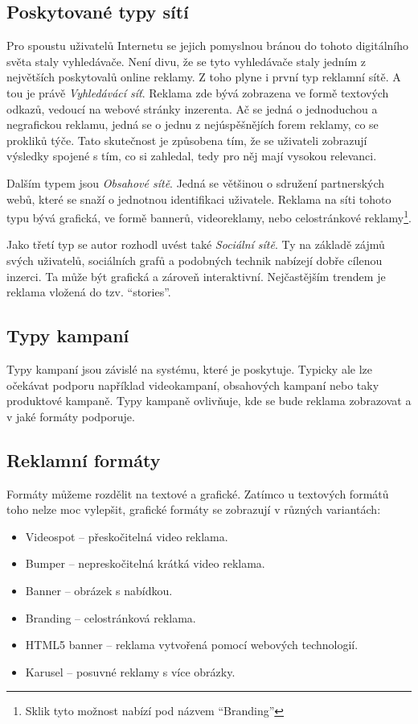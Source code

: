 \documentclass[czech,semestral]{diploma}
\begin{document}
\subsection{Poskytované typy sítí}
Pro spoustu uživatelů Internetu se jejich pomyslnou bránou do tohoto digitálního světa staly vyhledávače. Není divu, že se tyto vyhledávače staly jedním z největších
poskytovalů online reklamy. Z toho plyne i první typ reklamní sítě. A tou je právě \emph{Vyhledávácí síť}. Reklama zde bývá zobrazena ve formě textových odkazů,
vedoucí na webové stránky inzerenta. Ač se jedná o jednoduchou a negrafickou reklamu, jedná se o jednu z nejúspěšnějích forem reklamy, co se prokliků týče. Tato skutečnost
je způsobena tím, že se uživateli zobrazují výsledky spojené s tím, co si zahledal, tedy pro něj mají vysokou relevanci.

Dalším typem jsou \emph{Obsahové sítě}. Jedná se většinou o sdružení partnerských webů, které se snaží o jednotnou identifikaci uživatele. Reklama na síti tohoto typu bývá
grafická, ve formě bannerů, videoreklamy, nebo celostránkové reklamy\footnote{Sklik tyto možnost nabízí pod názvem \enquote{Branding}}.

Jako třetí typ se autor rozhodl uvést také \emph{Sociální sítě}. Ty na základě zájmů svých uživatelů, sociálních grafů a podobných technik nabízejí dobře cílenou inzerci.
Ta může být grafická a zároveň interaktivní. Nejčastějším trendem je reklama vložená do tzv. \enquote{stories}.

\subsection{Typy kampaní}
Typy kampaní jsou závislé na systému, které je poskytuje. Typicky ale lze očekávat podporu například videokampaní, obsahových kampaní nebo taky produktové kampaně.
Typy kampaně ovlivňuje, kde se bude reklama zobrazovat a v jaké formáty podporuje. 

\subsection{Reklamní formáty}
Formáty můžeme rozdělit na textové a grafické. Zatímco u textových formátů toho nelze moc vylepšit, grafické formáty se zobrazují v různých variantách:
\begin{itemize}
    \item Videospot -- přeskočitelná video reklama.
    \item Bumper -- nepreskočitelná krátká video reklama.
    \item Banner -- obrázek s nabídkou.
    \item Branding -- celostránková reklama.
    \item HTML5 banner -- reklama vytvořená pomocí webových technologií.
    \item Karusel -- posuvné reklamy s více obrázky.
\end{itemize} 
\end{document}
